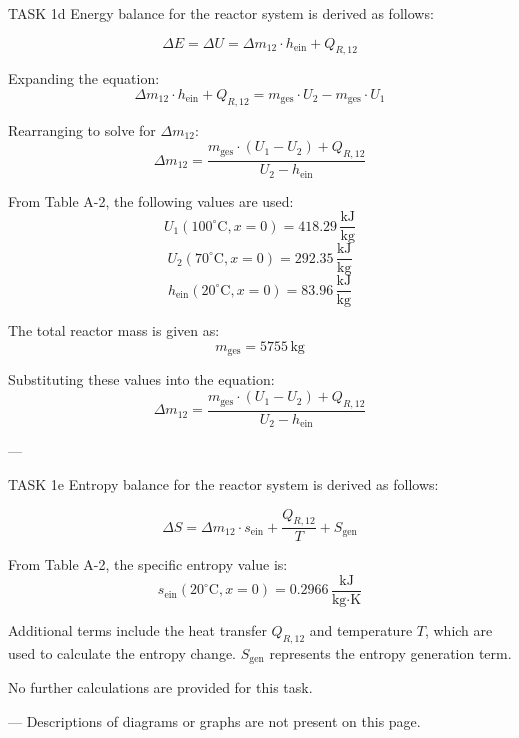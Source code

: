 TASK 1d  
Energy balance for the reactor system is derived as follows:  

\[
\Delta E = \Delta U = \Delta m_{12} \cdot h_{\text{ein}} + Q_{R,12}
\]

Expanding the equation:  
\[
\Delta m_{12} \cdot h_{\text{ein}} + Q_{R,12} = m_{\text{ges}} \cdot U_2 - m_{\text{ges}} \cdot U_1
\]

Rearranging to solve for \( \Delta m_{12} \):  
\[
\Delta m_{12} = \frac{m_{\text{ges}} \cdot (U_1 - U_2) + Q_{R,12}}{U_2 - h_{\text{ein}}}
\]

From Table A-2, the following values are used:  
\[
U_1 (100^\circ\text{C}, x=0) = 418.29 \, \frac{\text{kJ}}{\text{kg}}
\]  
\[
U_2 (70^\circ\text{C}, x=0) = 292.35 \, \frac{\text{kJ}}{\text{kg}}
\]  
\[
h_{\text{ein}} (20^\circ\text{C}, x=0) = 83.96 \, \frac{\text{kJ}}{\text{kg}}
\]

The total reactor mass is given as:  
\[
m_{\text{ges}} = 5755 \, \text{kg}
\]

Substituting these values into the equation:  
\[
\Delta m_{12} = \frac{m_{\text{ges}} \cdot (U_1 - U_2) + Q_{R,12}}{U_2 - h_{\text{ein}}}
\]

---

TASK 1e  
Entropy balance for the reactor system is derived as follows:  

\[
\Delta S = \Delta m_{12} \cdot s_{\text{ein}} + \frac{Q_{R,12}}{T} + S_{\text{gen}}
\]

From Table A-2, the specific entropy value is:  
\[
s_{\text{ein}} (20^\circ\text{C}, x=0) = 0.2966 \, \frac{\text{kJ}}{\text{kg·K}}
\]

Additional terms include the heat transfer \( Q_{R,12} \) and temperature \( T \), which are used to calculate the entropy change. \( S_{\text{gen}} \) represents the entropy generation term.  

No further calculations are provided for this task.  

---  
Descriptions of diagrams or graphs are not present on this page.